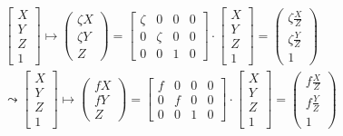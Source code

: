 				\begin{gather}
		\begin{bmatrix}
		X\\Y\\Z\\1
		\end{bmatrix} \mapsto
		\begin{pmatrix}
		\zeta X\\ \zeta Y\\ Z
		\end{pmatrix}
		=
		\begin{bmatrix}
		\zeta&0&0&0\\
		0&\zeta&0&0\\
		0&0&1&0
		\end{bmatrix}
		\cdot
		\begin{bmatrix}
		X\\Y\\Z\\1
		\end{bmatrix}
		=
		\begin{pmatrix}
		\zeta \frac{X}{Z}\\ \zeta \frac{Y}{Z}\\1
		\end{pmatrix}\\
	\leadsto
		\begin{bmatrix}
		X\\Y\\Z\\1
		\end{bmatrix} \mapsto
		\begin{pmatrix}
		f X\\ f Y\\ Z
		\end{pmatrix}
		=
		\begin{bmatrix}
		f&0&0&0\\
		0&f&0&0\\
		0&0&1&0
		\end{bmatrix}
		\cdot
		\begin{bmatrix}
		X\\Y\\Z\\1
		\end{bmatrix}
		=
		\begin{pmatrix}
		f \frac{X}{Z}\\ f \frac{Y}{Z}\\1
		\end{pmatrix}
		\end{gather}
		
